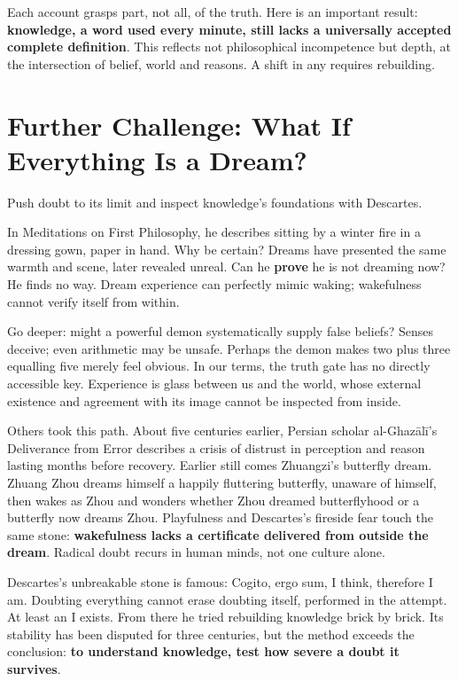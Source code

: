 Each account grasps part, not all, of the truth. Here is an important result: \textbf{knowledge, a word used every minute, still lacks a universally accepted complete definition}. This reflects not philosophical incompetence but depth, at the intersection of belief, world and reasons. A shift in any requires rebuilding.

\section[Further Challenge: If Everything Is a Dream]{Further Challenge: What If Everything Is a Dream?}
Push doubt to its limit and inspect knowledge's foundations with Descartes.

In Meditations on First Philosophy, he describes sitting by a winter fire in a dressing gown, paper in hand. Why be certain? Dreams have presented the same warmth and scene, later revealed unreal. Can he \textbf{prove} he is not dreaming now? He finds no way. Dream experience can perfectly mimic waking; wakefulness cannot verify itself from within.

Go deeper: might a powerful demon systematically supply false beliefs? Senses deceive; even arithmetic may be unsafe. Perhaps the demon makes two plus three equalling five merely feel obvious. In our terms, the truth gate has no directly accessible key. Experience is glass between us and the world, whose external existence and agreement with its image cannot be inspected from inside.

Others took this path. About five centuries earlier, Persian scholar al-Ghazālī's Deliverance from Error describes a crisis of distrust in perception and reason lasting months before recovery. Earlier still comes Zhuangzi's butterfly dream. Zhuang Zhou dreams himself a happily fluttering butterfly, unaware of himself, then wakes as Zhou and wonders whether Zhou dreamed butterflyhood or a butterfly now dreams Zhou. Playfulness and Descartes's fireside fear touch the same stone: \textbf{wakefulness lacks a certificate delivered from outside the dream}. Radical doubt recurs in human minds, not one culture alone.

Descartes's unbreakable stone is famous: Cogito, ergo sum, I think, therefore I am. Doubting everything cannot erase doubting itself, performed in the attempt. At least an I exists. From there he tried rebuilding knowledge brick by brick. Its stability has been disputed for three centuries, but the method exceeds the conclusion: \textbf{to understand knowledge, test how severe a doubt it survives}.

